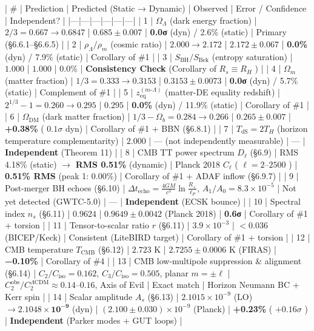 \documentclass[11pt,a4paper]{article}
\theoremstyle{definition}
\theoremstyle{remark}
\begin{document}
| \# | Prediction | Predicted (Static → Dynamic) | Observed | Error / Confidence | Independent? |
|---|---|---|---|---|---|
| 1 | $\Omega_\Lambda$ (dark energy fraction) | $2/3 = 0.667 \to \mathbf{0.6847}$ | $0.685 \pm 0.007$ | \textbf{0.0σ} (dyn) / 2.6\% (static) | Primary (\S 6.6.1–\S 6.6.5) |
| 2 | $\rho_\Lambda / \rho_m$ (cosmic ratio) | $2.000 \to \mathbf{2.172}$ | $2.172 \pm 0.067$ | \textbf{0.0\%} (dyn) / 7.9\% (static) | Corollary of \#1 |
| 3 | $S_{\text{BH}} / S_{\text{Bek}}$ (entropy saturation) | $1.000$ | $1.000$ | 0.0\% | \textbf{Consistency Check} (Corollary of $R_s \equiv R_H$ ) |
| 4 | $\Omega_m$ (matter fraction) | $1/3 = 0.333 \to \mathbf{0.3153}$ | $0.3153 \pm 0.0073$ | \textbf{0.0σ} (dyn) / 5.7\% (static) | Complement of \#1 |
| 5 | $z_{\text{eq}}^{(m\text{-}\Lambda)}$ (matter-DE equality redshift) | $2^{1/3} - 1 = 0.260 \to \mathbf{0.295}$ | $0.295$ | \textbf{0.0\%} (dyn) / 11.9\% (static) | Corollary of \#1 |
| 6 | $\Omega_{\text{DM}}$ (dark matter fraction) | $1/3 - \Omega_b = 0.284 \to \mathbf{0.266}$ | $0.265 \pm 0.007$ | \textbf{+0.38\%} ( $0.1\sigma$ dyn) | Corollary of \#1 + BBN (\S 6.8.1) |
| 7 | $T_{\text{dS}} = 2 T_H$ (horizon temperature complementarity) | $2.000$ | — (not independently measurable) | — | \textbf{Independent} (Theorem 11) |
| 8 | CMB TT power spectrum $D_\ell$ (\S 6.9) | RMS 4.18\% (static) $\to$ \textbf{RMS 0.51\%} (dynamic) | Planck 2018 $C_\ell$ ( $\ell = 2\text{--}2500$ ) | \textbf{0.51\% RMS} (peak 1: 0.00\%) | Corollary of \#1 + ADAF inflow (\S 6.9.7) |
| 9 | Post-merger BH echoes (\S 6.10) | $\Delta t_{\text{echo}} = \frac{4GM}{c^3}\ln\frac{R_+}{\ell_P}$, $A_1/A_0 = 8.3 \times 10^{-5}$ | Not yet detected (GWTC-5.0) | — | \textbf{Independent} (ECSK bounce) |
| 10 | Spectral index $n_s$ (\S 6.11) | $0.9624$ | $0.9649 \pm 0.0042$ (Planck 2018) | \textbf{0.6σ} | Corollary of \#1 + torsion |
| 11 | Tensor-to-scalar ratio $r$ (\S 6.11) | $3.9 \times 10^{-3}$ | $< 0.036$ (BICEP/Keck) | Consistent (LiteBIRD target) | Corollary of \#1 + torsion |
| 12 | CMB temperature $T_{\text{CMB}}$ (\S 6.12) | $2.723$ K | $2.7255 \pm 0.0006$ K (FIRAS) | \textbf{−0.10\%} | Corollary of \#4 |
| 13 | CMB low-multipole suppression \& alignment (\S 6.14) | $C_2/C_{\text{iso}} = 0.162$, $C_3/C_{\text{iso}} = 0.505$, planar $m=\pm\ell$ | $C_2^{\text{obs}}/C_2^{\Lambda\text{CDM}} \approx 0.14\text{--}0.16$, Axis of Evil | Exact match | Horizon Neumann BC + Kerr spin |
| 14 | Scalar amplitude $A_s$ (\S 6.13) | $2.1015 \times 10^{-9}$ (LO) $\to \mathbf{2.1048 \times 10^{-9}}$ (dyn) | $(2.100 \pm 0.030) \times 10^{-9}$ (Planck) | \textbf{+0.23\%} ( $+0.16\sigma$ ) | \textbf{Independent} (Parker modes + GUT loops) |
\end{document}
